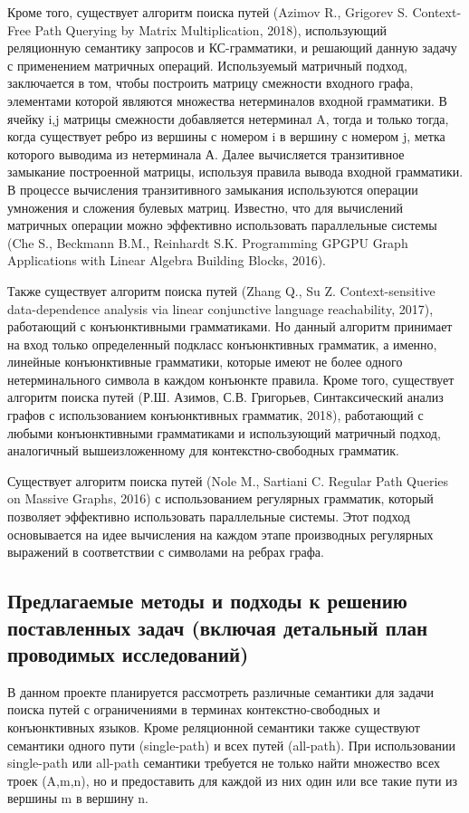 \documentclass[12pt]{article}  %
\theoremstyle{remark}
\begin{document}
Кроме того, существует алгоритм поиска путей (Azimov R., Grigorev S. Context-Free Path Querying by Matrix Multiplication, 2018), использующий реляционную семантику запросов и КС-грамматики, и решающий данную задачу с применением матричных операций. Используемый матричный подход, заключается в том, чтобы построить матрицу смежности входного графа, элементами которой являются множества нетерминалов входной грамматики. В ячейку i,j матрицы смежности добавляется нетерминал A, тогда и только тогда, когда существует ребро из вершины с номером i в вершину с номером j, метка которого выводима из нетерминала А. Далее вычисляется транзитивное замыкание построенной матрицы, используя правила вывода входной грамматики. В процессе вычисления транзитивного замыкания используются операции умножения и сложения булевых матриц. Известно, что для вычислений матричных операции можно эффективно использовать параллельные системы (Che S., Beckmann B.M., Reinhardt S.K. Programming GPGPU Graph Applications with Linear Algebra Building Blocks, 2016).

Также существует алгоритм поиска путей (Zhang Q., Su Z. Context-sensitive data-dependence analysis via linear conjunctive language reachability, 2017), работающий с конъюнктивными грамматиками. Но данный алгоритм принимает на вход только определенный подкласс конъюнктивных грамматик, а именно, линейные конъюнктивные грамматики, которые имеют не более одного нетерминального символа в каждом конъюнкте правила. Кроме того, существует алгоритм поиска путей (Р.Ш. Азимов, С.В. Григорьев, Синтаксический анализ графов с использованием конъюнктивных грамматик, 2018), работающий с любыми конъюнктивными грамматиками и использующий матричный подход, аналогичный вышеизложенному для контекстно-свободных грамматик.

Существует алгоритм поиска путей (Nole M., Sartiani C. Regular Path Queries on Massive Graphs, 2016) с использованием регулярных грамматик, который позволяет эффективно использовать параллельные системы. Этот подход основывается на идее вычисления на каждом этапе производных регулярных выражений в соответствии с символами на ребрах графа.

\subsection{Предлагаемые методы и подходы к решению поставленных задач (включая детальный план проводимых исследований)}
В данном проекте планируется рассмотреть различные семантики для задачи поиска путей с ограничениями в терминах контекстно-свободных и конъюнктивных языков. Кроме реляционной семантики также существуют семантики одного пути (single-path) и всех путей (all-path). При использовании single-path или all-path семантики требуется не только найти множество всех троек (A,m,n), но и предоставить для каждой из них один или все такие пути из вершины m в вершину n.
\end{document}
